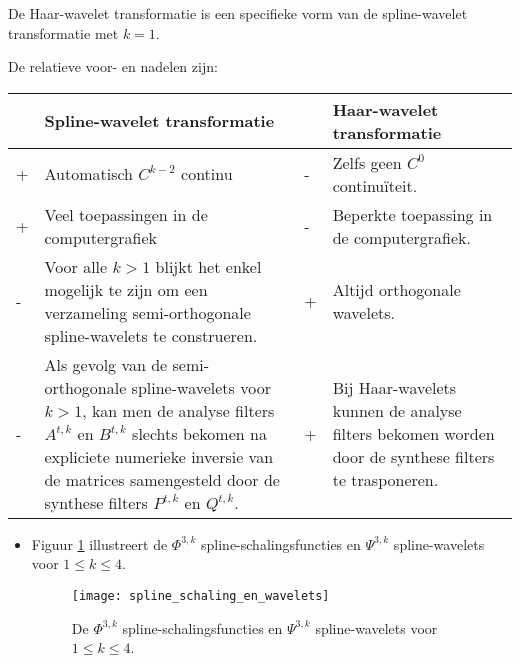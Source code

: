\documentclass{report}
\begin{document}
\begin{enumerate}
{\begin{itemize}
			De Haar-wavelet transformatie is een specifieke vorm van de spline-wavelet transformatie met $k = 1$. 

			De relatieve voor- en nadelen zijn:
			\begin{table}[ht]
				\centering
				\begin{tabular}{| l | p{0.3\textwidth} | l | p{}|}
					 \hline
					 & Spline-wavelet transformatie & & Haar-wavelet transformatie \\
					 \hline
					 + & Automatisch $C^{k - 2}$ continu & - & Zelfs geen $C^0$ continuïteit. \\
					 \hline
					 + & Veel toepassingen in de computergrafiek & - & Beperkte toepassing in de computergrafiek.\\
					 \hline
					 - & Voor alle $k > 1$ blijkt het enkel mogelijk te zijn om een verzameling semi-orthogonale spline-wavelets te construeren. & + & Altijd orthogonale wavelets. \\
					 \hline
					 - & Als gevolg van de semi-orthogonale spline-wavelets voor $k > 1$, kan men de analyse filters $A^{t,k}$ en $B^{t,k}$ slechts bekomen na expliciete numerieke inversie van de matrices samengesteld door de synthese filters $P^{t, k}$ en $Q^{t, k}$. & + & Bij Haar-wavelets kunnen de analyse filters bekomen worden door de synthese filters te trasponeren. \\
					\hline
				\end{tabular}
			\end{table}
		\end{itemize}
	}

			
	{
		\begin{itemize} 
			\item Figuur \ref{fig:spline_schaling_wavelet} illustreert de $\Phi^{3, k}$ spline-schalingsfuncties en $\Psi^{3, k}$ spline-wavelets voor  $1 \leq k \leq 4$.
			\begin{figure}[ht]
				\centering
				\texttt{[image: spline\_schaling\_en\_wavelets]}
				\caption{De $\Phi^{3, k}$ spline-schalingsfuncties en $\Psi^{3, k}$ spline-wavelets voor $1 \leq k \leq 4$.}
				\label{fig:spline_schaling_wavelet}
			\end{figure}
		\end{itemize}
		}
\end{enumerate}
\end{document}
